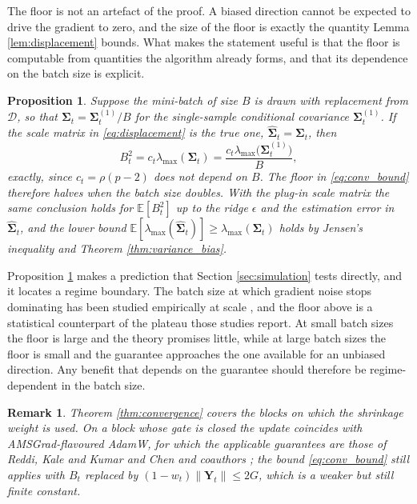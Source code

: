 \documentclass[pdflatex,sn-mathphys-num]{sn-jnl}%
\theoremstyle{thmstyleone}%
\newtheorem{proposition}[theorem]{Proposition}%
\theoremstyle{thmstyletwo}%
\newtheorem{remark}{Remark}%
\theoremstyle{thmstylethree}%
\newcommand{\E}{\mathbb{E}}
\begin{document}
The floor is not an artefact of the proof. A biased direction cannot be expected to drive the gradient to zero, and the size of the floor is exactly the quantity Lemma \ref{lem:displacement} bounds. What makes the statement useful is that the floor is computable from quantities the algorithm already forms, and that its dependence on the batch size is explicit.

\begin{proposition}
\label{prop:batch}
Suppose the mini-batch of size $B$ is drawn with replacement from $\mathcal D$, so that $\bm\Sigma_t=\bm\Sigma^{(1)}_t/B$ for the single-sample conditional covariance $\bm\Sigma^{(1)}_t$. If the scale matrix in \eqref{eq:displacement} is the true one, $\widehat{\bm\Sigma}_t=\bm\Sigma_t$, then
\begin{equation}
B^2_t=c_t\lambda_{\max}(\bm\Sigma_t)=\frac{c_t\lambda_{\max}\bigl(\bm\Sigma^{(1)}_t\bigr)}{B},
\end{equation}
exactly, since $c_t=\rho(p-2)$ does not depend on $B$. The floor in \eqref{eq:conv_bound} therefore halves when the batch size doubles. With the plug-in scale matrix the same conclusion holds for $\E[B^2_t]$ up to the ridge $\epsilon$ and the estimation error in $\widehat{\bm\Sigma}_t$, and the lower bound $\E[\lambda_{\max}(\widehat{\bm\Sigma}_t)]\ge\lambda_{\max}(\bm\Sigma_t)$ holds by Jensen's inequality and Theorem \ref{thm:variance_bias}.
\end{proposition}

Proposition \ref{prop:batch} makes a prediction that Section \ref{sec:simulation} tests directly, and it locates a regime boundary. The batch size at which gradient noise stops dominating has been studied empirically at scale \cite{keskar2017, smith2018, shallue2019}, and the floor above is a statistical counterpart of the plateau those studies report. At small batch sizes the floor is large and the theory promises little, while at large batch sizes the floor is small and the guarantee approaches the one available for an unbiased direction. Any benefit that depends on the guarantee should therefore be regime-dependent in the batch size.

\begin{remark}
Theorem \ref{thm:convergence} covers the blocks on which the shrinkage weight is used. On a block whose gate is closed the update coincides with AMSGrad-flavoured AdamW, for which the applicable guarantees are those of Reddi, Kale and Kumar \cite{reddi2018} and Chen and coauthors \cite{chen2019}; the bound \eqref{eq:conv_bound} still applies with $B_t$ replaced by $(1-w_t)\|\bm Y_t\|\le 2G$, which is a weaker but still finite constant.
\end{remark}
\end{document}
